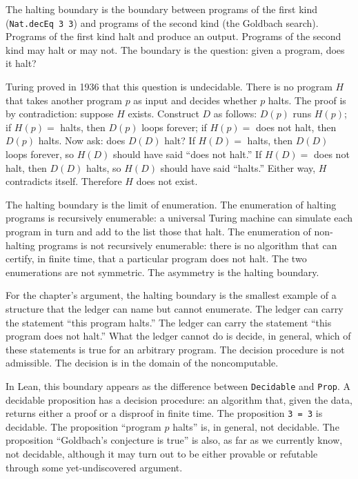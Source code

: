 The halting boundary is the boundary between programs of the first kind
(\texttt{Nat.decEq 3 3}) and programs of the second kind (the Goldbach
search). Programs of the first kind halt and produce an output. Programs of
the second kind may halt or may not. The boundary is the question: given a
program, does it halt?

Turing proved in 1936 that this question is undecidable. There is no
program $H$ that takes another program $p$ as input and decides whether $p$
halts. The proof is by contradiction: suppose $H$ exists. Construct $D$ as
follows: $D(p)$ runs $H(p)$; if $H(p) = $ halts, then $D(p)$ loops forever;
if $H(p) = $ does not halt, then $D(p)$ halts. Now ask: does $D(D)$ halt?
If $H(D) = $ halts, then $D(D)$ loops forever, so $H(D)$ should have said
``does not halt.'' If $H(D) = $ does not halt, then $D(D)$ halts, so $H(D)$
should have said ``halts.'' Either way, $H$ contradicts itself. Therefore
$H$ does not exist.

The halting boundary is the limit of enumeration. The enumeration of halting
programs is recursively enumerable: a universal Turing machine can simulate
each program in turn and add to the list those that halt. The enumeration of
non-halting programs is not recursively enumerable: there is no algorithm
that can certify, in finite time, that a particular program does not halt.
The two enumerations are not symmetric. The asymmetry is the halting
boundary.

For the chapter's argument, the halting boundary is the smallest example of
a structure that the ledger can name but cannot enumerate. The ledger can
carry the statement ``this program halts.'' The ledger can carry the
statement ``this program does not halt.'' What the ledger cannot do is
decide, in general, which of these statements is true for an arbitrary
program. The decision procedure is not admissible. The decision is in the
domain of the noncomputable.

In Lean, this boundary appears as the difference between \texttt{Decidable}
and \texttt{Prop}. A decidable proposition has a decision procedure: an
algorithm that, given the data, returns either a proof or a disproof in
finite time. The proposition \texttt{3 = 3} is decidable. The proposition
``program $p$ halts'' is, in general, not decidable. The proposition
``Goldbach's conjecture is true'' is also, as far as we currently know, not
decidable, although it may turn out to be either provable or refutable
through some yet-undiscovered argument.

